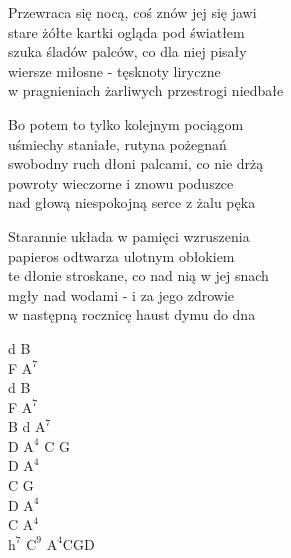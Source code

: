 \begin{text}
Przewraca się nocą, coś znów jej się jawi\\
stare żółte kartki ogląda pod światłem\\
szuka śladów palców, co dla niej pisały\\
wiersze miłosne - tęsknoty liryczne\\
w pragnieniach żarliwych przestrogi niedbałe

\vin Bo potem to tylko kolejnym pociągom\\
\vin uśmiechy staniałe, rutyna pożegnań\\
\vin swobodny ruch dłoni palcami, co nie drżą\\
\vin powroty wieczorne i znowu poduszce\\
\vin nad głową niespokojną serce z żalu pęka

Starannie układa w pamięci wzruszenia\\
papieros odtwarza ulotnym obłokiem\\
te dłonie stroskane, co nad nią w jej snach\\
mgły nad wodami - i za jego zdrowie\\
w następną rocznicę haust dymu do dna
\end{text}
\begin{chord}
    d B\\
    F $\mathrm{A^7}$\\
    d B\\
    F $\mathrm{A^7}$\\
    B d $\mathrm{A^7}$\\
    D $\mathrm{A^4}$ C G\\
    D $\mathrm{A^4}$\\
    C G\\
    D $\mathrm{A^4}$\\
    C $\mathrm{A^4}$\\
    \small{$\mathrm{h^7}$ $\mathrm{C^9}$ $\mathrm{A^4}$CGD}\\
\end{chord}
